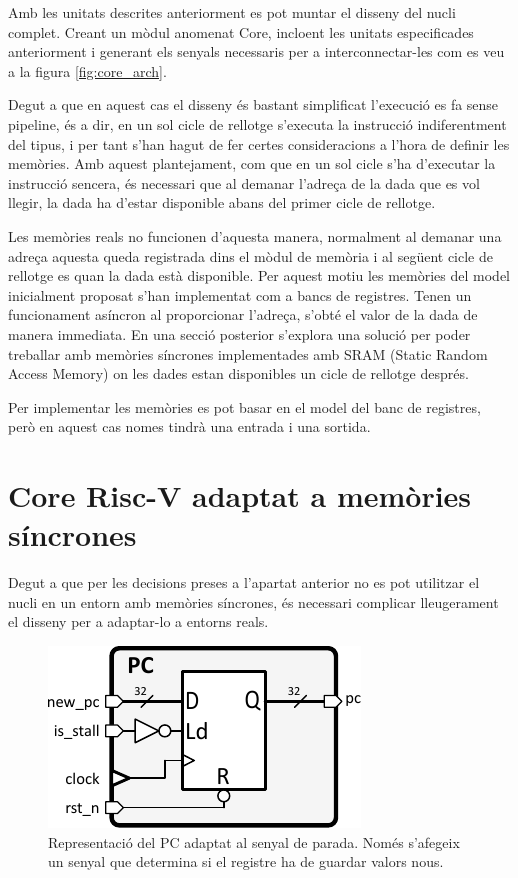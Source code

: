 \documentclass[10pt,a4paper,twocolumn,twoside]{article}
\begin{document}
    Amb les unitats descrites anteriorment es pot muntar el disseny del nucli complet. Creant un mòdul anomenat Core, incloent les unitats especificades anteriorment i generant els senyals necessaris per a interconnectar-les com es veu a la figura \ref{fig:core_arch}.
    
    Degut a que en aquest cas el disseny és bastant simplificat l'execució es fa sense pipeline, és a dir, en un sol cicle de rellotge s'executa la instrucció indiferentment del tipus, i per tant s'han hagut de fer certes consideracions a l'hora de definir les memòries. 
    Amb aquest plantejament, com que en un sol cicle s’ha d’executar la instrucció sencera, és necessari que al demanar l’adreça de la dada que es vol llegir, la dada ha d’estar disponible abans del primer cicle de rellotge. 
    
    Les memòries reals no funcionen d'aquesta manera, normalment al demanar una adreça aquesta queda registrada dins el mòdul de memòria i al següent cicle de rellotge es quan la dada està disponible. Per aquest motiu les memòries del model inicialment proposat s'han implementat com a bancs de registres. Tenen un funcionament asíncron al proporcionar l'adreça, s'obté el valor de la dada de manera immediata. En una secció posterior s'explora una solució per poder treballar amb memòries síncrones implementades amb SRAM (Static Random Access Memory) on les dades estan disponibles un cicle de rellotge després.
    
    Per implementar les memòries es pot basar en el model del banc de registres, però en aquest cas nomes tindrà una entrada i una sortida.

        
        
\section{Core Risc-V adaptat a memòries síncrones}
\label{sec:Pulp}
    Degut a que per les decisions preses a l'apartat anterior no es pot utilitzar el nucli en un entorn amb memòries síncrones, és necessari complicar lleugerament el disseny per a adaptar-lo a entorns reals. 
    
    \begin{figure}[!ht]
    \centering
    	\includegraphics[width=0.5\linewidth]{pdf/PC_stall.pdf}
        \caption{Representació del PC adaptat al senyal de parada. Només s'afegeix un senyal que determina si el registre ha de guardar valors nous.}
        \label{fig:pc_stall}
    \end{figure}
    
\end{document}
